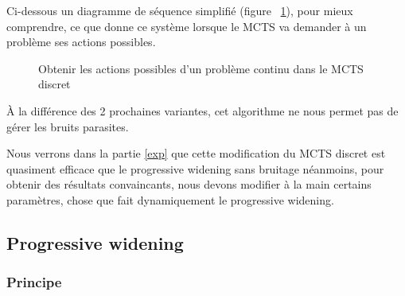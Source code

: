 \documentclass[pdftex,french, english]{article}	%
\begin{document}
		Ci-dessous un diagramme de séquence simplifié (figure ~\ref{fig:actionsPossibles}), pour mieux comprendre, ce que donne ce système lorsque le MCTS va demander à un problème ses actions possibles.
		\begin{figure}[H]
			\centering
			\caption{Obtenir les actions possibles d'un problème continu dans le MCTS discret} \label{fig:actionsPossibles}
		\end{figure}

À la différence des 2 prochaines variantes, cet algorithme ne nous permet pas de gérer les bruits parasites.
		
        Nous verrons dans la partie \ref{exp} que cette modification du MCTS discret est quasiment efficace que le progressive widening sans bruitage néanmoins, pour obtenir des résultats convaincants, nous devons modifier à la main certains paramètres, chose que fait dynamiquement le progressive widening.
        
	\subsection{Progressive widening} \label{pw}

		\subsubsection{Principe} \label{pw:principe}
\end{document}
